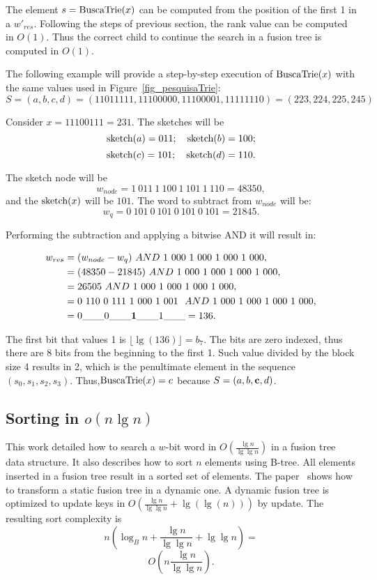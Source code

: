 \documentclass[11pt]{article}
\newcommand{\sk}[1]{\mbox{\rm{sketch}}(#1)}
\newcommand{\trs}[1]{\mbox{\rm{BuscaTrie}}(#1)}
\begin{document}
The element $s=\trs{x}$  can be computed from the position of the first 1 in a $w'_{res}$. Following the steps of previous section, the rank value can be computed in $O(1)$. Thus the correct child to continue the search in a fusion tree is computed in $O(1)$.

The following example will provide a step-by-step execution of $\trs{x}$ with the same values used in Figure~\ref{fig_pesquisaTrie}:
$$S=(a,b,c,d)=(11011111, 11100000, 11100001, 11111110)=(223,224,225,245)$$

Consider $x = 11100111=231$. The sketches will be 
$$ \sk{a} = 011;~~~ \sk{b} = 100; $$
$$\sk{c} = 101;~~~ \sk{d} = 110. $$

The sketch node will be
$$ w_{node} = 1~011~1~100~1~101~1~110=48350,$$
and the $\sk{x}$ will be $101$. The word to subtract from  $ w_{node}$ will be:
$$ w_q = 0~101~0~101~0~101~0~101 =21845.$$

Performing the subtraction and applying a bitwise AND it will result in:


\begin{equation}
\begin{aligned}
w_{res}& = (w_{node} - w_q) ~AND~ 1~000~1~000~1~000~1~000, \\
& =(48350-21845)~AND~ 1~000~1~000~1~000~1~000, \\
& =26505~AND~ 1~000~1~000~1~000~1~000,\\
& = 0~110~0~111~1~000~1~001~~AND~1~000~1~000~1~000~1~000,  \\
& = 0\_\_\_0\_\_\_{\bf 1}\_\_\_1\_\_\_  = 136.
\end{aligned}
\end{equation}

The first bit that values 1 is $\lfloor\lg (136)\rfloor=b_7$. The bits are zero indexed, thus there are 8 bits from the beginning to the first 1. Such value divided by the block size 4 results in 2, which 
is the penultimate element in the sequence $(s_0,s_1,s_2,s_3)$. Thus,$\trs{x}=c$ because $S=(a,b,{\bf c},d)$.







\subsection{
Sorting in  $o(n \lg n)$
}

This work detailed how to search a $w$-bit word in  $O(\frac{\lg n}{\lg \lg n})$  in a fusion tree data structure. It also describes how to sort $n$ elements using B-tree.  All elements inserted in a fusion tree result in a sorted set of elements.
The paper~\cite{dynamic} shows how to transform a static fusion tree in a dynamic one. A dynamic fusion tree is optimized to update keys in $O(\frac{\lg n}{\lg \lg n} + \lg(\lg(n)))$ by update. The resulting sort complexity is
\[  n \left(\log_B n + \frac{\lg n}{\lg \lg n}+\lg\lg n \right) = \]
\[  O\left(n \frac{\lg n}{\lg \lg n}\right).  \]
\end{document}
